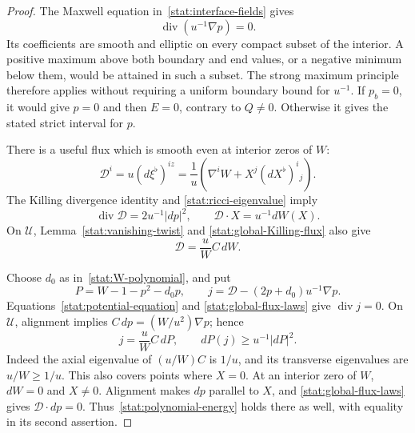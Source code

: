 \begin{proof}
The Maxwell equation in~\eqref{stat:interface-fields} gives
\begin{equation}
 \operatorname{div}(u^{-1}\nabla p)=0.
 \label{stat:potential-equation}
\end{equation}
Its coefficients are smooth and elliptic on every compact subset
of the interior.  A positive maximum above both boundary and end
values, or a negative minimum below them, would be attained in such
a subset.  The strong maximum principle therefore applies without
requiring a uniform boundary bound for $u^{-1}$.  If $p_b=0$, it
would give $p=0$ and then $E=0$, contrary to $Q\ne0$.  Otherwise it
gives the stated strict interval for $p$.

There is a useful flux which is smooth even at interior zeros of
$W$:
\begin{equation}
 \mathcal D^i=u(d\xi^\flat)^{iz}
  =\frac1u\left(\nabla^iW+X^j(dX^\flat)^i{}_j\right).
 \label{stat:global-Killing-flux}
\end{equation}
The Killing divergence identity and
\eqref{stat:ricci-eigenvalue} imply
\begin{equation}
 \operatorname{div}\mathcal D=2u^{-1}|dp|^2,
 \qquad \mathcal D\cdot X=u^{-1}dW(X).
 \label{stat:global-flux-laws}
\end{equation}
On $\mathcal U$, Lemma~\ref{stat:vanishing-twist} and
\eqref{stat:global-Killing-flux} also give
\begin{equation}
 \mathcal D=\frac uW C\,dW.
 \label{stat:positive-Killing-flux}
\end{equation}

Choose $d_0$ as in~\eqref{stat:W-polynomial}, and put
\[
 P=W-1-p^2-d_0p,\qquad
 j=\mathcal D-(2p+d_0)u^{-1}\nabla p.
\]
Equations~\eqref{stat:potential-equation} and
\eqref{stat:global-flux-laws} give $\operatorname{div}j=0$.
On $\mathcal U$, alignment implies
$C\,dp=(W/u^2)\nabla p$; hence
\begin{equation}
 j=\frac uW C\,dP,
 \qquad dP(j)\geq u^{-1}|dP|^2.
 \label{stat:polynomial-energy}
\end{equation}
Indeed the axial eigenvalue of $(u/W)C$ is $1/u$, and its
transverse eigenvalues are $u/W\geq1/u$.  This also covers points
where $X=0$.  At an interior zero of $W$, $dW=0$ and $X\ne0$.
Alignment makes $dp$ parallel to $X$, and
\eqref{stat:global-flux-laws} gives $\mathcal D\cdot dp=0$.
Thus~\eqref{stat:polynomial-energy} holds there as well, with
equality in its second assertion.


\end{proof}
